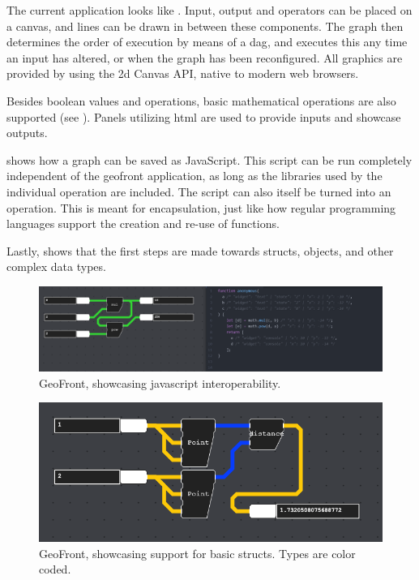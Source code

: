 The current application looks like . Input, output and operators can be placed on a canvas, and lines can be drawn in between these components. The graph then determines the order of execution by means of a \ac{dag}, and executes this any time an input has altered, or when the graph has been reconfigured. All graphics are provided by using the 2d Canvas API, native to modern web browsers.

Besides boolean values and operations, basic mathematical operations are also supported (see ). Panels utilizing html are used to provide inputs and showcase outputs. 

 shows how a graph can be saved as JavaScript. This script can be run completely independent of the geofront application, as long as the libraries used by the individual operation are included. The script can also itself be turned into an operation. This is meant for encapsulation, just like how regular programming languages support the creation and re-use of functions.

Lastly,  shows that the first steps are made towards structs, objects, and other complex data types. 

\begin{figure}[!tbp]
  \centering
  \begin{minipage}[b]{1.0\textwidth}
    \includegraphics[width=\textwidth]{../images/geofront-3.PNG}
    \caption{GeoFront, showcasing javascript interoperability.}
    \label{fig:geofront-3}
  \end{minipage}
\end{figure}

\begin{figure}[!tbp]
  \centering
  \begin{minipage}[b]{1.0\textwidth}
    \includegraphics[width=\textwidth]{../images/geofront-4.PNG}
    \caption{GeoFront, showcasing support for basic structs. Types are color coded.}
    \label{fig:geofront-4}
  \end{minipage}
\end{figure}